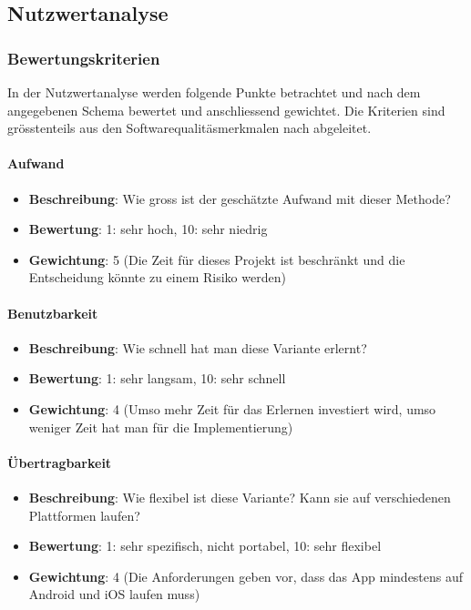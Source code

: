 \newpage
\subsection{Nutzwertanalyse}\label{architektur_nutzwertanalyse}

\subsubsection{Bewertungskriterien}\label{architektur_bewertungspunkte}

In der Nutzwertanalyse werden folgende Punkte betrachtet und nach dem angegebenen Schema bewertet und anschliessend gewichtet. Die Kriterien sind grösstenteils aus den Softwarequalitäsmerkmalen nach \cite{iso_9126} abgeleitet.

\paragraph{Aufwand}
\begin{itemize}
	\item \textbf{Beschreibung}: Wie gross ist der geschätzte Aufwand mit dieser Methode?
	\item \textbf{Bewertung}: 1: sehr hoch, 10: sehr niedrig
	\item \textbf{Gewichtung}: 5 (Die Zeit für dieses Projekt ist beschränkt und die Entscheidung könnte zu einem Risiko werden)
\end{itemize}

\paragraph{Benutzbarkeit}
\begin{itemize}
	\item \textbf{Beschreibung}: Wie schnell hat man diese Variante erlernt? 
	\item \textbf{Bewertung}: 1: sehr langsam, 10: sehr schnell
	\item \textbf{Gewichtung}: 4 (Umso mehr Zeit für das Erlernen investiert wird, umso weniger Zeit hat man für die Implementierung)
\end{itemize}

\paragraph{Übertragbarkeit}
\begin{itemize}
	\item \textbf{Beschreibung}: Wie flexibel ist diese Variante? Kann sie auf verschiedenen Plattformen laufen? 
	\item \textbf{Bewertung}: 1: sehr spezifisch, nicht portabel, 10: sehr flexibel
	\item \textbf{Gewichtung}: 4 (Die Anforderungen geben vor, dass das App mindestens auf Android und iOS laufen muss)
\end{itemize}

